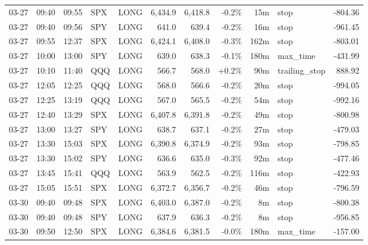 \documentclass[11pt,a4paper,twoside]{article}
\begin{document}
\begin{center}
\begin{longtable}{>{\color{txtmain}}l l l l l r r r r >{\color{txtmain}}l r}
03-27 & 09:40 & 09:55 & SPX & LONG & 6,434.9 & 6,418.8 & \textcolor{lossred}{-0.2\%} & 15m & stop & \textcolor{lossred}{-804.36} \\
03-27 & 09:40 & 09:56 & SPY & LONG & 641.0 & 639.4 & \textcolor{lossred}{-0.2\%} & 16m & stop & \textcolor{lossred}{-961.45} \\
03-27 & 09:55 & 12:37 & SPX & LONG & 6,424.1 & 6,408.0 & \textcolor{lossred}{-0.3\%} & 162m & stop & \textcolor{lossred}{-803.01} \\
03-27 & 10:00 & 13:00 & SPY & LONG & 639.0 & 638.3 & \textcolor{lossred}{-0.1\%} & 180m & max\_time & \textcolor{lossred}{-431.99} \\
03-27 & 10:10 & 11:40 & QQQ & LONG & 566.7 & 568.0 & \textcolor{wingreen}{+0.2\%} & 90m & trailing\_stop & \textcolor{wingreen}{888.92} \\
03-27 & 12:05 & 12:25 & QQQ & LONG & 568.0 & 566.6 & \textcolor{lossred}{-0.2\%} & 20m & stop & \textcolor{lossred}{-994.05} \\
03-27 & 12:25 & 13:19 & QQQ & LONG & 567.0 & 565.5 & \textcolor{lossred}{-0.2\%} & 54m & stop & \textcolor{lossred}{-992.16} \\
03-27 & 12:40 & 13:29 & SPX & LONG & 6,407.8 & 6,391.8 & \textcolor{lossred}{-0.2\%} & 49m & stop & \textcolor{lossred}{-800.98} \\
03-27 & 13:00 & 13:27 & SPY & LONG & 638.7 & 637.1 & \textcolor{lossred}{-0.2\%} & 27m & stop & \textcolor{lossred}{-479.03} \\
03-27 & 13:30 & 15:03 & SPX & LONG & 6,390.8 & 6,374.9 & \textcolor{lossred}{-0.2\%} & 93m & stop & \textcolor{lossred}{-798.85} \\
03-27 & 13:30 & 15:02 & SPY & LONG & 636.6 & 635.0 & \textcolor{lossred}{-0.3\%} & 92m & stop & \textcolor{lossred}{-477.46} \\
03-27 & 13:45 & 15:41 & QQQ & LONG & 563.9 & 562.5 & \textcolor{lossred}{-0.2\%} & 116m & stop & \textcolor{lossred}{-422.93} \\
03-27 & 15:05 & 15:51 & SPX & LONG & 6,372.7 & 6,356.7 & \textcolor{lossred}{-0.2\%} & 46m & stop & \textcolor{lossred}{-796.59} \\
03-30 & 09:40 & 09:48 & SPX & LONG & 6,403.0 & 6,387.0 & \textcolor{lossred}{-0.2\%} & 8m & stop & \textcolor{lossred}{-800.38} \\
03-30 & 09:40 & 09:48 & SPY & LONG & 637.9 & 636.3 & \textcolor{lossred}{-0.2\%} & 8m & stop & \textcolor{lossred}{-956.85} \\
03-30 & 09:50 & 12:50 & SPX & LONG & 6,384.6 & 6,381.5 & \textcolor{lossred}{-0.0\%} & 180m & max\_time & \textcolor{lossred}{-157.00} \\

\end{longtable}
\end{center}
\end{document}
